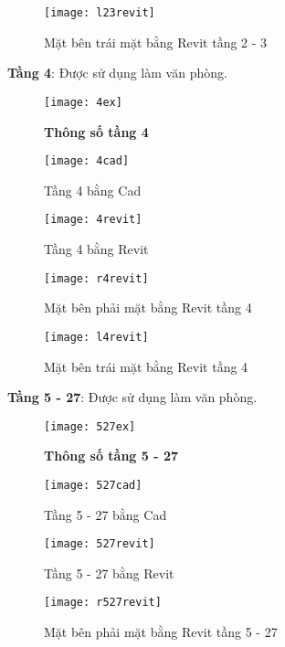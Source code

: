 \begin{figure}[H]
	\centering
	\texttt{[image: l23revit]}
	\caption{Mặt bên trái mặt bằng Revit tầng 2 - 3}
	\label{23revit}
\end{figure} 

\newpage
\textbf{Tầng 4}: Được sử dụng làm văn phòng.
\begin{figure}[H]
	\centering
	\texttt{[image: 4ex]}
	\caption{\textbf{Thông số tầng 4}}
	\label{4ex}
\end{figure}

\begin{figure}[H]
  \centering
  \texttt{[image: 4cad]}
  \caption{Tầng 4 bằng Cad}
  \label{4cad}
\end{figure}

\begin{figure}[H]
  \centering
  \texttt{[image: 4revit]}
  \caption{Tầng 4 bằng Revit}
  \label{4revit}
\end{figure} 

\begin{figure}[H]
	\centering
	\texttt{[image: r4revit]}
	\caption{Mặt bên phải mặt bằng Revit tầng 4}
	\label{4revit}
\end{figure} 

\begin{figure}[H]
	\centering
	\texttt{[image: l4revit]}
	\caption{Mặt bên trái mặt bằng Revit tầng 4}
	\label{4revit}
\end{figure} 

\newpage
\textbf{Tầng 5 - 27}: Được sử dụng làm văn phòng.
\begin{figure}[H]
	\centering
	\texttt{[image: 527ex]}
	\caption{\textbf{Thông số tầng 5 - 27}}
	\label{527ex}
\end{figure}

\begin{figure}[H]
  \centering
  \texttt{[image: 527cad]}
  \caption{Tầng 5 - 27 bằng Cad}
  \label{527cad}
\end{figure}

\begin{figure}[H]
  \centering
  \texttt{[image: 527revit]}
  \caption{Tầng 5 - 27 bằng Revit}
  \label{527revit}
\end{figure} 

\begin{figure}[H]
	\centering
	\texttt{[image: r527revit]}
	\caption{Mặt bên phải mặt bằng Revit tầng 5 - 27}
	\label{527revit}
\end{figure} 

